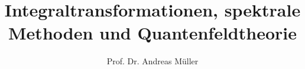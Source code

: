 %
%
%


\beamertemplatenavigationsymbolsempty
\title[QFT]{Integraltransformationen, spektrale Methoden und Quantenfeldtheorie}
\author[A.~Müller]{Prof. Dr. Andreas Müller}
\date[]{}

